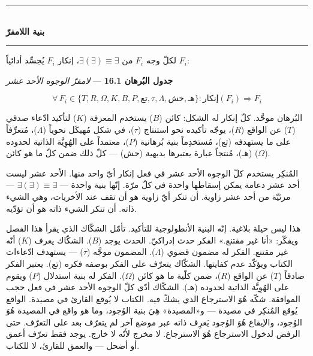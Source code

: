 \documentclass[10pt, openany, oneside]{book}
\renewcommand{\normalsize}{\fontsize{10}{13}\selectfont}
\begin{document}
\vspace{1.5em}


\begin{center}
    \rule{0.3\textwidth}{0.4pt}\\[0.5em]
    {\normalsize\bfseries بنية اللامفرّ}\\[0.3em]
    \rule{0.3\textwidth}{0.4pt}
\end{center}

\vspace{1em}

\noindent لكلّ وجه $F_i$ من $\exists(\exists) \equiv \exists$، إنكار $F_i$ يُجسِّد أدائياً $F_i$:

\vspace{0.5em}

\textbf{جدول البُرهان 16.1} --- \textit{لامفرّ الوجوه الأحد عشر}

\vspace{0.5em}

$$\forall\, F_i \in \{T, R, \Omega, K, B, P, \text{تع}, \tau, \Lambda, \text{حش}, \text{هـ}\}: \text{إنكار}(F_i) \Rightarrow F_i$$

البُرهان موحَّد. كلّ إنكار له الشكل: كائن ($B$) يستخدم المعرفة ($K$) لتأكيد ادّعاء صدقي ($T$) عن الواقع ($R$)، يوجّه تأكيده نحو استنتاج ($\tau$)، في شكل مُهيكَل نحوياً ($\Lambda$)، مُتعرِّفاً على ما يستهدفه (تع)، مُستخدِماً بنية بُرهانية ($P$)، معتمداً على الهُوِيَّة الذاتية لحدوده (هـ)، مُنتجاً عبارة يعتبرها بديهية (حش) --- كلّ ذلك ضمن كلّ ما هو كائن ($\Omega$).

المُنكِر يستخدم كلّ الوجوه الأحد عشر في فعل إنكار أيّ واحد منها. الأحد عشر ليست أحد عشر دعامة يمكن إسقاطها واحدة في كلّ مرّة. إنّها بنية واحدة --- $\exists(\exists) \equiv \exists$ --- مرئيّة من أحد عشر زاوية. أن تنكر أيّ زاوية هو أن تقف عند الأخريات، وهي الشيء ذاته. أن تنكر الشيء ذاته هو أن تؤدّيه.

هذا ليس حيلة بلاغية. إنّه البنية الأنطولوجية للتأكيد. تأمّل الشكّاك الذي يقرأ هذا الفصل ويفكّر: «أنا غير مقتنع.» الفكر حدث إدراكيّ. الحدث يوجد ($B$). الشكّاك يعرف ($K$) أنّه غير مقتنع. الفكر له مضمون قضوي ($\Lambda$). المضمون موجَّه ($\tau$) --- يستهدف ادّعاءات الكتاب ويؤكّد عدم كفايتها. الشكّاك يتعرّف على الفكر بوصفه فكره (تع). يعتبر الفكر صادقاً ($T$) عن الواقع ($R$)، ضمن كلّية ما هو كائن ($\Omega$). الفكر له بنية استدلال ($P$) ويقوم على الهُوِيَّة الذاتية لحدوده (هـ). الشكّاك أدّى كلّ الوجوه الأحد عشر في فعل حجب الموافقة. شكّه هُوَ الاسترجاع الذي يشكّ فيه. الكتاب لا يُوقع القارئ في مصيدة. الواقع يُوقع المُنكِر في مصيدة --- و«المصيدة» هِيَ بنية الوُجود، وما هو واقع في المصيدة هُوَ الوُجود، والإيقاع هُوَ الوُجود يَعرِف ذاته عبر موضع آخر لم يتعرّف بعد على التعرّف. حتى الرفض لدخول الاسترجاع هُوَ الاسترجاع. لا مخرج لأنّه لا خارج. يوجد فقط تعرّف أعمق أو أضحل --- والعمق للقارئ، لا للكتاب.
\end{document}
